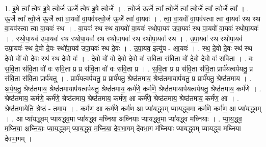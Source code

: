 \documentclass[17pt]{extarticle}
\begin{document}
1. इ॒षे त्वा᳚ त्वे॒ष इ॒षे त्वो॒र्ज ऊ॒र्जे त्वे॒ष इ॒षे त्वो॒र्जे । . त्वो॒र्ज ऊ॒र्जे त्वा᳚ त्वो॒र्जे त्वा᳚ त्वो॒र्जे त्वा᳚ त्वो॒र्जे त्वा᳚ । . ऊ॒र्जे त्वा᳚ त्वो॒र्ज ऊ॒र्जे त्वा॑ वा॒यवो॑ वा॒यव॑स्त्वो॒र्ज ऊ॒र्जे त्वा॑ वा॒यवः॑ । . त्वा॒ वा॒यवो॑ वा॒यव॑स्त्वा त्वा वा॒यवः॑ स्थ स्थ वा॒यव॑स्त्वा त्वा वा॒यवः॑ स्थ । . वा॒यवः॑ स्थ स्थ वा॒यवो॑ वा॒यवः॑ स्थोपा॒यव॑ उपा॒यवः॑ स्थ वा॒यवो॑ वा॒यवः॑ स्थोपा॒यवः॑ । . स्थो॒पा॒यव॑ उपा॒यवः॑ स्थ स्थोपा॒यवः॑ स्थ स्थोपा॒यवः॑ स्थ स्थोपा॒यवः॑ स्थ । . उ॒पा॒यवः॑ स्थ स्थोपा॒यव॑ उपा॒यवः॑ स्थ दे॒वो दे॒वः स्थो॑पा॒यव॑ उपा॒यवः॑ स्थ दे॒वः । . उ॒पा॒यव॒ इत्यु॑प - आ॒यवः॑ । . स्थ॒ दे॒वो दे॒वः स्थ॑ स्थ दे॒वो वो॑ वो दे॒वः स्थ॑ स्थ दे॒वो वः॑ । . दे॒वो वो॑ वो दे॒वो दे॒वो वः॑ सवि॒ता स॑वि॒ता वो॑ दे॒वो दे॒वो वः॑ सवि॒ता । . वः॒ स॒वि॒ता स॑वि॒ता वो॑ वः सवि॒ता प्र प्र स॑वि॒ता वो॑ वः सवि॒ता प्र । . स॒वि॒ता प्र प्र स॑वि॒ता स॑वि॒ता प्रार्प॑यत्वर्पयतु॒ प्र स॑वि॒ता स॑वि॒ता प्रार्प॑यतु । . प्रार्प॑यत्वर्पयतु॒ प्र प्रार्प॑यतु॒ श्रेष्ठ॑तमाय॒ श्रेष्ठ॑तमायार्पयतु॒ प्र प्रार्प॑यतु॒ श्रेष्ठ॑तमाय । . अ॒र्प॒य॒तु॒ श्रेष्ठ॑तमाय॒ श्रेष्ठ॑तमायार्पयत्वर्पयतु॒ श्रेष्ठ॑तमाय॒ कर्म॑णे॒ कर्म॑णे॒ श्रेष्ठ॑तमायार्पयत्वर्पयतु॒ श्रेष्ठ॑तमाय॒ कर्म॑णे । . श्रेष्ठ॑तमाय॒ कर्म॑णे॒ कर्म॑णे॒ श्रेष्ठ॑तमाय॒ श्रेष्ठ॑तमाय॒ कर्म॑ण॒ आ कर्म॑णे॒ श्रेष्ठ॑तमाय॒ श्रेष्ठ॑तमाय॒ कर्म॑ण॒ आ । . श्रेष्ठ॑तमा॒येति॒ श्रेष्ठ॑ - त॒मा॒य॒ । . कर्म॑ण॒ आ कर्म॑णे॒ कर्म॑ण॒ आ प्या॑यद्ध्वम् प्यायद्ध्व॒मा कर्म॑णे॒ कर्म॑ण॒ आ प्या॑यद्ध्वम् । . आ प्या॑यद्ध्वम् प्यायद्ध्व॒मा प्या॑यद्ध्व मघ्निया अघ्नियाः प्यायद्ध्व॒मा प्या॑यद्ध्व मघ्नियाः । . प्या॒य॒द्ध्व॒ म॒घ्नि॒या॒ अ॒घ्नि॒याः॒ प्या॒य॒द्ध्व॒म् प्या॒य॒द्ध्व॒ म॒घ्नि॒या॒ दे॒व॒भा॒गम् दे॑वभा॒ग म॑घ्नियाः प्यायद्ध्वम् प्यायद्ध्व मघ्निया देवभा॒गम् । \newline
\end{document}
